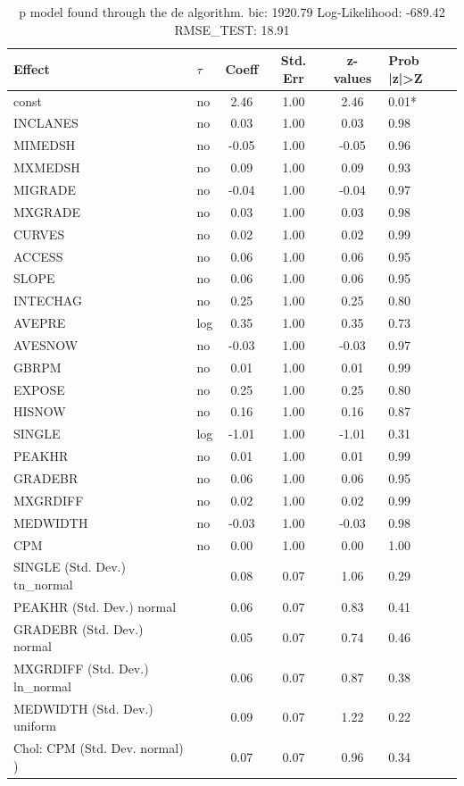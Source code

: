 \begin{table}
	\caption{p model found through the de algorithm. bic: 1920.79 Log-Likelihood: -689.42 RMSE_TEST: 18.91}
	\begin{center}
		\begin{tabular}{|l|l|c|c|c|l|}
			\hline
			Effect & $\tau$ & Coeff & Std. Err & z-values & Prob |z|>Z \\
			\hline
			const & no & 2.46 & 1.00 & 2.46 & 0.01* \\
			\hline
			INCLANES & no & 0.03 & 1.00 & 0.03 & 0.98 \\
			\hline
			MIMEDSH & no & -0.05 & 1.00 & -0.05 & 0.96 \\
			\hline
			MXMEDSH & no & 0.09 & 1.00 & 0.09 & 0.93 \\
			\hline
			MIGRADE & no & -0.04 & 1.00 & -0.04 & 0.97 \\
			\hline
			MXGRADE & no & 0.03 & 1.00 & 0.03 & 0.98 \\
			\hline
			CURVES & no & 0.02 & 1.00 & 0.02 & 0.99 \\
			\hline
			ACCESS & no & 0.06 & 1.00 & 0.06 & 0.95 \\
			\hline
			SLOPE & no & 0.06 & 1.00 & 0.06 & 0.95 \\
			\hline
			INTECHAG & no & 0.25 & 1.00 & 0.25 & 0.80 \\
			\hline
			AVEPRE & log & 0.35 & 1.00 & 0.35 & 0.73 \\
			\hline
			AVESNOW & no & -0.03 & 1.00 & -0.03 & 0.97 \\
			\hline
			GBRPM & no & 0.01 & 1.00 & 0.01 & 0.99 \\
			\hline
			EXPOSE & no & 0.25 & 1.00 & 0.25 & 0.80 \\
			\hline
			HISNOW & no & 0.16 & 1.00 & 0.16 & 0.87 \\
			\hline
			SINGLE & log & -1.01 & 1.00 & -1.01 & 0.31 \\
			\hline
			PEAKHR & no & 0.01 & 1.00 & 0.01 & 0.99 \\
			\hline
			GRADEBR & no & 0.06 & 1.00 & 0.06 & 0.95 \\
			\hline
			MXGRDIFF & no & 0.02 & 1.00 & 0.02 & 0.99 \\
			\hline
			MEDWIDTH & no & -0.03 & 1.00 & -0.03 & 0.98 \\
			\hline
			CPM & no & 0.00 & 1.00 & 0.00 & 1.00 \\
			\hline
			SINGLE (Std. Dev.) tn_normal &  & 0.08 & 0.07 & 1.06 & 0.29 \\
			\hline
			PEAKHR (Std. Dev.) normal &  & 0.06 & 0.07 & 0.83 & 0.41 \\
			\hline
			GRADEBR (Std. Dev.) normal &  & 0.05 & 0.07 & 0.74 & 0.46 \\
			\hline
			MXGRDIFF (Std. Dev.) ln_normal &  & 0.06 & 0.07 & 0.87 & 0.38 \\
			\hline
			MEDWIDTH (Std. Dev.) uniform &  & 0.09 & 0.07 & 1.22 & 0.22 \\
			\hline
			 Chol: CPM (Std. Dev. normal) ) &  & 0.07 & 0.07 & 0.96 & 0.34 \\
			\hline
		\end{tabular}
	\end{center}
\end{table}